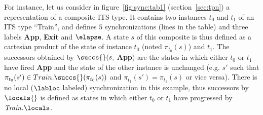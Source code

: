 For instance, let us consider in figure~\ref{fig:sync:tab1} (section~\ref{sec:tpn}) a representation of a composite ITS type. It contains
two instances $t_0$ and $t_1$ of an ITS type ``Train'', and defines $5$
synchronizations (lines in the table) and three labels \textbf{App},
\textbf{Exit} and $\elapse$. A state $s$ of this composite is thus defined as
a cartesian product of the state of instance $t_0$ (noted $\pi_{t_0}(s)$) and
$t_1$. The successors obtained by $\succs{}(s,$ \textbf{App}$)$ are the states
in which either $t_0$ or $t_1$ have fired \textbf{App} and the state of the
other instance is unchanged (e.g. $s'$ such that $\pi_{t_0}(s') \in
Train.\succs{}(\pi_{t_0}(s))$ and $\pi_{t_1}(s') = \pi_{t_1}(s)$ or vice
versa). There is no local ($\labloc$ labeled) synchronization in this
example, thus successors by $\locals{}$ is defined as states in which either 
$t_0$ or $t_1$ have progressed by $\mathit{Train}.\locals$.

